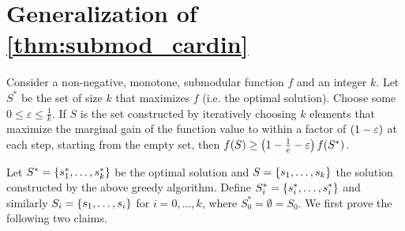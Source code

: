 \section{Generalization of \cref{thm:submod_cardin}}
\label{sec:submod_cardin_modify}

\begin{theorem}
    Consider a non-negative, monotone, submodular function $f$ and an integer $k$. Let $S^*$ be the set of size $k$ that maximizes $f$ (i.e.\! the optimal solution). 
    Choose some $0 \leq \varepsilon \leq \frac{1}{k}$.
    If $S$ is the set constructed by iteratively choosing $k$ elements that maximize the marginal gain of the function value 
    to within a factor of $\left( 1-\varepsilon \right)$ at each step, starting from the empty set, 
    then $f \! \left( S \right) \geq \left( 1 - \frac{1}{e} - \varepsilon \right)f \! \left( S^* \right)$. 
    \label{thm:submod_cardin_gen}
\end{theorem}

Let $S^{\ast} = \left\{ s_1^{\ast}, \ldots, s_k^{\ast} \right\}$ be the optimal solution and $S = \left\{ s_1, \ldots, s_k \right\}$ the solution constructed by the above greedy algorithm.
Define $S_i^{\ast} = \left\{ s_i^{\ast}, \ldots, s_i^{\ast} \right\}$ and similarly $S_i = \left\{ s_1, \ldots, s_i \right\}$ for $i = 0, \ldots, k$, where $S_0^{\ast} = \emptyset = S_0$. 
We first prove the following two claims. 

